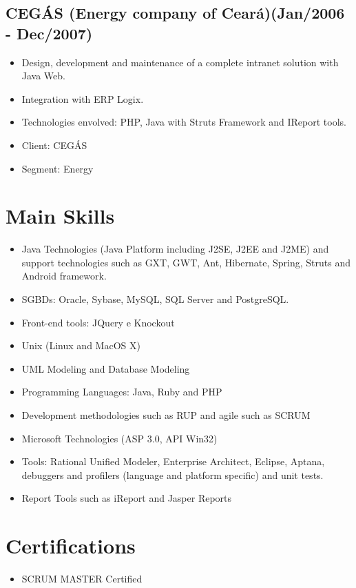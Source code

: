 \documentclass[letterpaper]{article}
\begin{document}
\subsection*{CEGÁS (Energy company of Ceará)(Jan/2006 - Dec/2007)}
\begin{itemize}
\item Design, development and maintenance of a complete intranet solution with Java Web.
\item Integration with ERP Logix.
\item Technologies envolved: PHP, Java with Struts Framework and IReport tools.
\item Client: CEGÁS
\item Segment: Energy
\end{itemize}

\section*{Main Skills}
\begin{itemize}
  \item Java Technologies (Java Platform including J2SE, J2EE and J2ME) and support technologies such as GXT, GWT, Ant, Hibernate, Spring, Struts and Android framework. 
  \item SGBDs: Oracle, Sybase, MySQL, SQL Server and PostgreSQL.
  \item Front-end tools: JQuery e Knockout  
  \item Unix (Linux and MacOS X)
  \item UML Modeling and Database Modeling
  \item Programming Languages: Java, Ruby and PHP
  \item Development methodologies such as RUP and agile such as SCRUM
  \item Microsoft Technologies (ASP 3.0, API Win32)
  \item Tools: Rational Unified Modeler, Enterprise Architect, Eclipse, Aptana, debuggers and profilers (language and platform specific) and unit tests.
  \item Report Tools such as iReport and Jasper Reports
\end{itemize}

\section*{Certifications}
\begin{itemize}
  \item SCRUM MASTER Certified
\end{itemize}
\end{document}
